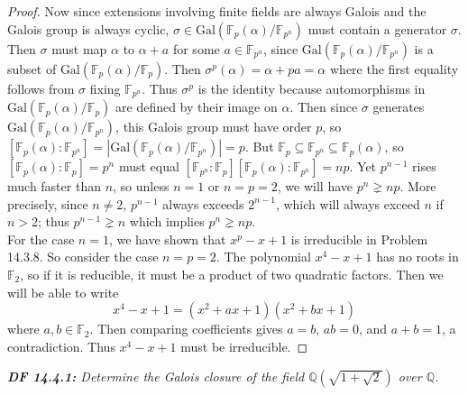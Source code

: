 \documentclass{article}
\begin{document}
\begin{proof}
    Now since extensions involving finite fields are always Galois and the
    Galois group is always cyclic,
    $\sigma\in\text{Gal}(\mathbb{F}_p(\alpha)/\mathbb{F}_{p^n})$ must
    contain a generator $\sigma$. Then $\sigma$ must map
    $\alpha$ to $\alpha+a$ for some $a\in\mathbb{F}_{p^n}$, since
    $\text{Gal}(\mathbb{F}_p(\alpha)/\mathbb{F}_{p^n})$ is a subset of
    $\text{Gal}(\mathbb{F}_p(\alpha)/\mathbb{F}_{p})$. Then
    $\sigma^p(\alpha)=\alpha+pa=\alpha$ where the first equality follows
    from $\sigma$ fixing $\mathbb{F}_{p^n}$. Thus $\sigma^p$ is the
    identity because automorphisms in
    $\text{Gal}(\mathbb{F}_p(\alpha)/\mathbb{F}_p)$ are defined by their
    image on $\alpha$. Then since $\sigma$ generates
    $\text{Gal}(\mathbb{F}_p(\alpha)/\mathbb{F}_{p^n})$, this Galois group
    must have order $p$, so $[\mathbb{F}_p(\alpha):\mathbb{F}_{p^n}]
    =|\text{Gal}(\mathbb{F}_p(\alpha)/\mathbb{F}_{p^n})|=p$. But
    $\mathbb{F}_p\subseteq\mathbb{F}_{p^n}\subseteq\mathbb{F}_p(\alpha)$,
    so $[\mathbb{F}_{p}(\alpha):\mathbb{F}_p]=p^n$ must equal
    $[\mathbb{F}_{p^n}:\mathbb{F}_p]
    [\mathbb{F}_{p}(\alpha):\mathbb{F}_{p^n}]=np$. Yet $p^{n-1}$ rises much
    faster than $n$, so unless $n=1$ or
    $n=p=2$, we will have $p^n\gneq np$. More precisely, since $n\neq2$,
    $p^{n-1}$ always exceeds $2^{n-1}$, which will always exceed $n$ if
    $n>2$; thus $p^{n-1}\gneq n$ which implies $p^n\gneq np$. \\

    For the case $n=1$, we have shown that $x^p-x+1$ is irreducible in
    Problem 14.3.8. So consider the case $n=p=2$. The polynomial $x^4-x+1$
    has no roots in $\mathbb{F}_2$, so if it is reducible, it must be a
    product of two quadratic factors. Then we will be able to write
    \[x^4-x+1 =(x^2+ax+1)(x^2+bx+1)\]
    where $a,b\in\mathbb{F}_2$. Then comparing coefficients gives
    $a=b$, $ab=0$, and $a+b=1$, a contradiction. Thus $x^4-x+1$ must be
    irreducible.
  \end{proof}

\it \textbf{DF 14.4.1:} Determine the Galois closure of the field
  $\mathbb{Q}(\sqrt{1+\sqrt{2}})$ over $\mathbb{Q}$.
\end{document}
